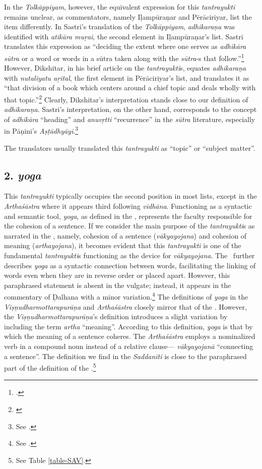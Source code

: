 In the \emph{Tolkāppiyam}, however, the equivalent expression for this 
\emph{tantrayukti} remains unclear, as commentators, namely Iḷampūraṇar and 
Pērāciriyar, list the item differently. In Sastri's translation of the 
\emph{Tolkāppiyam}, \emph{adhikaraṇa} was identified with \emph{atikāra 
muṟai}, the second element in Iḷampūraṇar's list. Sastri translates this expression 
as “deciding the extent where one serves as \emph{adhikāra sūtra} or a word or 
words in a sūtra taken along with the \emph{sūtra}-s that 
follow.”\footnote{\cite[233]{sast-1936}.} However, Dikshitar, in his brief article 
on 
the \emph{tantrayukti}s, equates \emph{adhikaraṇa} with \emph{nutaliyatu 
aṟital}, the first element in Pērāciriyar's list, and translates it as “that division of a 
book which centers around a chief topic and deals wholly with that 
topic.”\footnote{\cite[85]{diks-1930}} Clearly, Dikshitar's interpretation stands 
close to our definition of \emph{adhikaraṇa}. Sastri's interpretation, on the other 
hand, corresponds to the concept of \emph{adhikāra} “heading” and 
\emph{anuvṛtti} “recurrence” in the \emph{sūtra} literature, especially in 
Pāṇini's 
\emph{Aṣṭādhyāyī}.\footnote{See \cite[111]{chev-2009}.} 

The translators usually translated this \emph{tantrayukti} as “topic” or “subject 
matter”. 

\subsection{2. \emph{yoga}}

This \emph{tantrayukti} typically occupies the second position in most lists, 
except in the \emph{Arthaśāstra} where it appears third following 
\emph{vidhāna}. Functioning as a syntactic and semantic tool, \emph{yoga}, as 
defined in the \SS, represents the faculty responsible for the cohesion of a 
sentence. If we consider the main purpose of the \emph{tantrayukti}s as 
narrated 
in the \SS, namely, cohesion of a sentence (\emph{vākyayojana}) and cohesion 
of 
meaning (\emph{arthayojana}), it becomes evident that this \emph{tantrayukti} 
is one of the fundamental \emph{tantrayukti}s functioning as the device for 
\emph{vākyayojana}. The \SS\ further describes \emph{yoga} as a syntactic 
connection between words, facilitating the linking of words even when they are in 
reverse order or placed apart. However, this paraphrased statement is absent in 
the 
vulgate; instead, it appears in the commentary of Ḍalhana with a minor 
variation.\footnote{See .} The definitions of \emph{yoga} in 
the 
\emph{Viṣṇudharmottarapurāṇa} and \emph{Arthaśāstra} closely mirror that of 
the \SS. However, the \emph{Viṣṇudharmottarapurāṇa}'s definition introduces a 
slight variation by including the term \emph{artha} “meaning”. According to this 
definition, \emph{yoga} is that by which the meaning of a sentence coheres. The 
\emph{Arthaśāstra} employs a nominalized verb in a compound noun instead of 
a 
relative clause--- \emph{vākyayojanā} “connecting a sentence”. The definition 
we 
find in the \emph{Saddanīti} is close to the paraphrased part of the definition of 
the \SS.\footnote{See Table \ref{table-SAV}.}

